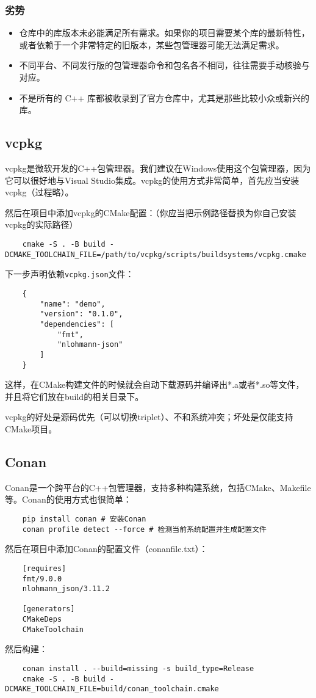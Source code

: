 \documentclass[../main]{subfiles}
\begin{document}
\subsubsection{劣势}
\begin{itemize}
  \item 仓库中的库版本未必能满足所有需求。如果你的项目需要某个库的最新特性，或者依赖于一个非常特定的旧版本，某些包管理器可能无法满足需求。
  \item 不同平台、不同发行版的包管理器命令和包名各不相同，往往需要手动核验与对应。
  \item 不是所有的 C++ 库都被收录到了官方仓库中，尤其是那些比较小众或新兴的库。
\end{itemize}

\subsection{vcpkg}

vcpkg是微软开发的C++包管理器。我们建议在Windows使用这个包管理器，因为它可以很好地与Visual Studio集成。vcpkg的使用方式非常简单，首先应当安装vcpkg（过程略）。

然后在项目中添加vcpkg的CMake配置：（你应当把示例路径替换为你自己安装vcpkg的实际路径）
\begin{lstlisting}
    cmake -S . -B build -DCMAKE_TOOLCHAIN_FILE=/path/to/vcpkg/scripts/buildsystems/vcpkg.cmake
\end{lstlisting}
下一步声明依赖\texttt{vcpkg.json}文件：
\begin{lstlisting}
    {
        "name": "demo",
        "version": "0.1.0",
        "dependencies": [
            "fmt",
            "nlohmann-json"
        ]
    }
\end{lstlisting}
这样，在CMake构建文件的时候就会自动下载源码并编译出*.a或者*.so等文件，并且将它们放在build的相关目录下。

vcpkg的好处是源码优先（可以切换triplet）、不和系统冲突；坏处是仅能支持CMake项目。

\subsection{Conan}

Conan是一个跨平台的C++包管理器，支持多种构建系统，包括CMake、Makefile等。Conan的使用方式也很简单：
\begin{lstlisting}
    pip install conan # 安装Conan
    conan profile detect --force # 检测当前系统配置并生成配置文件
\end{lstlisting}
然后在项目中添加Conan的配置文件（conanfile.txt）：
\begin{lstlisting}
    [requires]
    fmt/9.0.0
    nlohmann_json/3.11.2

    [generators]
    CMakeDeps
    CMakeToolchain
\end{lstlisting}
然后构建：
\begin{lstlisting}
    conan install . --build=missing -s build_type=Release
    cmake -S . -B build -DCMAKE_TOOLCHAIN_FILE=build/conan_toolchain.cmake
\end{lstlisting}
\end{document}
